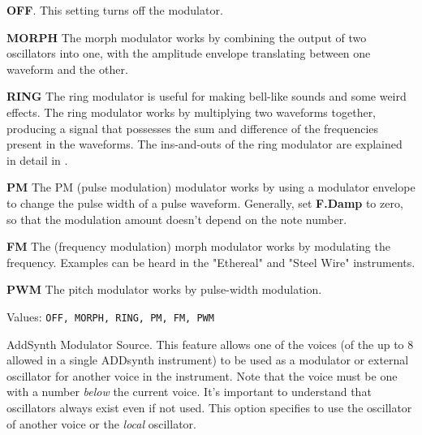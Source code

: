    \begin{enumber}
      \item \textbf{OFF}.
         This setting turns off the modulator.
      \item \textbf{MORPH}
         The morph modulator works by combining the output of two oscillators
         into one, with the amplitude envelope translating between one waveform
         and the other.
      \item \textbf{RING}
         The ring modulator is useful for making bell-like sounds and some
         weird effects.  The ring modulator works by multiplying two
         waveforms together, producing a signal that possesses the sum and
         difference of the frequencies present in the waveforms.  The
         ins-and-outs of the ring modulator are explained in detail in
         .
      \item \textbf{PM}
         The PM (pulse modulation) modulator works by using a modulator
         envelope to change the pulse width of a pulse waveform.
         Generally, set \textbf{F.Damp} to zero, so that the modulation amount
         doesn't depend on the note number.
      \item \textbf{FM}
         The (frequency modulation) morph modulator works by modulating the
         frequency.  Examples can be heard in the "Ethereal" and "Steel Wire"
         instruments.
      \item \textbf{PWM}
         The pitch modulator works by pulse-width modulation.
   \end{enumber}

   Values: \texttt{OFF, MORPH, RING, PM, FM, PWM}

   AddSynth Modulator Source.
   This feature allows one of the voices (of the up to 8 allowed in a single
   ADDsynth instrument) to be used as a modulator or external oscillator for
   another voice in the instrument.
   Note that the voice must be one with a number \textsl{below} the current
   voice.
   It's important to understand that oscillators always exist even if not
   used.
   This option specifies to use the oscillator of another voice or
   the \textsl{local} oscillator.

